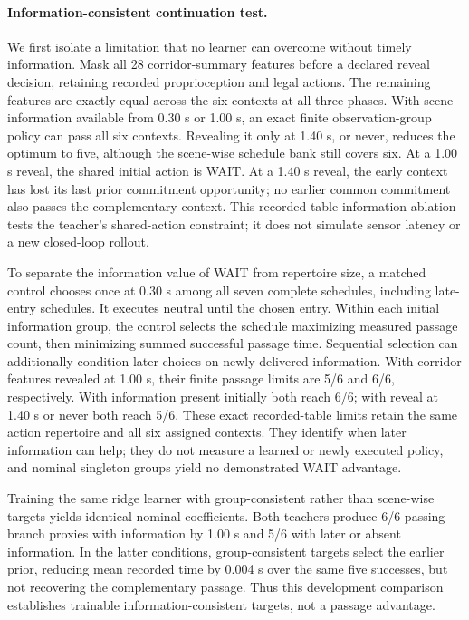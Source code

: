 \documentclass[10pt]{article}
\begin{document}
\paragraph{Information-consistent continuation test.}
We first isolate a limitation that no learner can overcome without timely
information. Mask all 28 corridor-summary features before a declared reveal
decision, retaining recorded proprioception and legal actions. The remaining
features are exactly equal across the six contexts at all three phases.
With scene information available from 0.30 s or 1.00 s, an exact finite
observation-group policy can pass all six contexts. Revealing it only at 1.40 s,
or never, reduces the optimum to five, although the scene-wise schedule bank
still covers six. At a 1.00 s reveal, the shared initial action is WAIT. At a
1.40 s reveal, the early context has lost its last prior commitment opportunity;
no earlier common commitment also passes the complementary context. This
recorded-table information ablation tests the teacher's shared-action constraint;
it does not simulate sensor latency or a new closed-loop rollout.

To separate the information value of WAIT from repertoire size, a matched
control chooses once at 0.30 s among all seven complete schedules, including
late-entry schedules. It executes neutral until the chosen entry. Within each
initial information group, the control selects the schedule maximizing measured
passage count, then minimizing summed successful passage time. Sequential
selection can additionally condition later choices on newly delivered information.
With corridor features revealed at 1.00 s, their finite passage limits are 5/6
and 6/6, respectively. With information present initially both reach 6/6; with
reveal at 1.40 s or never both reach 5/6. These exact recorded-table limits retain
the same action repertoire and all six assigned contexts. They identify when
later information can help; they do not measure a learned or newly executed
policy, and nominal singleton groups yield no demonstrated WAIT advantage.

Training the same ridge learner with group-consistent rather than scene-wise
targets yields identical nominal coefficients. Both teachers produce 6/6
passing branch proxies with information by 1.00 s and 5/6 with later or absent
information. In the latter conditions, group-consistent targets select the
earlier prior, reducing mean recorded time by 0.004 s over the same five successes,
but not recovering the complementary passage. Thus this development comparison
establishes trainable information-consistent targets, not a passage advantage.
\end{document}
